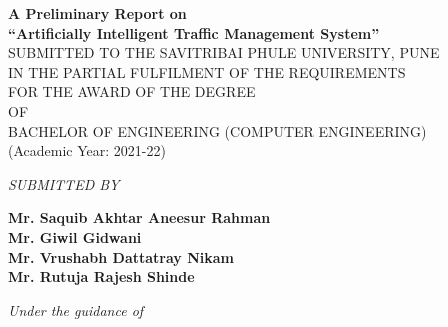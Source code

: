 \documentclass[openany,12pt]{report}
\begin{document}
	\lhead{}
	\chead{}
	\setlength{\headrulewidth}{0.4pt}
	\setlength{\footrulewidth}{0.4pt}
	\fontsize{12}{15}
	\begin{titlepage}
		\begin{center}
			{\bf A Preliminary Report on} \\
			\vspace{0.3in}
			{\Large \bf ``Artificially Intelligent Traffic Management System''}\\
			\vspace{0.3in}
			SUBMITTED TO THE SAVITRIBAI PHULE UNIVERSITY, PUNE\\
			IN THE PARTIAL FULFILMENT OF THE REQUIREMENTS \\
			FOR THE AWARD OF THE DEGREE \\
			\vspace{0.2in}
			OF\\  
			\vspace{0.2in}
			BACHELOR OF ENGINEERING (COMPUTER ENGINEERING)\\
			(Academic Year: 2021-22)\\
			\vspace{0.2in}
			
			{\it SUBMITTED BY}\\
			
			\vspace{0.2in}
			
			{\bf Mr. Saquib Akhtar Aneesur Rahman}\hspace*{\fill}{\bf (Exam Seat No. B150474298)}\\
			{\bf Mr. Giwil Gidwani }\hspace*{\fill}{\bf (Exam Seat No. B150474245)}\\
			{\bf Mr. Vrushabh Dattatray Nikam     }\hspace*{\fill}{\bf (Exam Seat No. B150474278)}\\
			{\bf Mr. Rutuja Rajesh Shinde    }\hspace*{\fill}{\bf (Exam Seat No. B150474304)}\\
			
			\vspace{0.4in}
			
			{\it Under the guidance of}\\
			
			\vspace{0.1in}
			

\end{center}
\end{titlepage}
\end{document}
